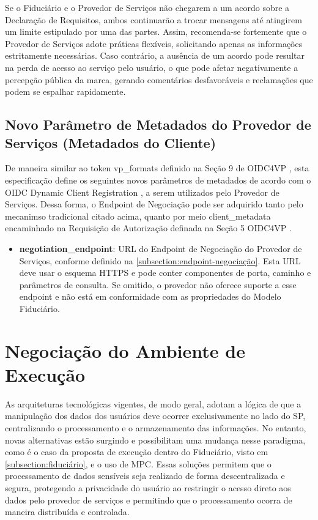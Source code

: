 Se o Fiduciário e o Provedor de Serviços não chegarem a um acordo sobre a Declaração de Requisitos, ambos continuarão a trocar mensagens até atingirem um limite estipulado por uma das partes. Assim, recomenda-se fortemente que o Provedor de Serviços adote práticas flexíveis, solicitando apenas as informações estritamente necessárias. Caso contrário, a ausência de um acordo pode resultar na perda de acesso ao serviço pelo usuário, o que pode afetar negativamente a percepção pública da marca, gerando comentários desfavoráveis e reclamações que podem se espalhar rapidamente.

\subsection{Novo Parâmetro de Metadados do Provedor de Serviços (Metadados do Cliente)}

De maneira similar ao token vp\_formats definido na Seção 9 de \acs{OIDC4VP} \cite{OIDC4VP2023}, esta especificação define os seguintes novos parâmetros de metadados de acordo com o \acs{OIDC Dynamic Client Registration} \cite{sakimura2023openidDiscovery}, a serem utilizados pelo Provedor de Serviços. Dessa forma, o Endpoint de Negociação pode ser adquirido tanto pelo mecanimso tradicional citado acima, quanto por meio client\_metadata encaminhado na Requisição de Autorização definada na Seção 5 \acs{OIDC4VP} \cite{OIDC4VP2023}.

\begin{itemize}
    \item \textbf{negotiation\_endpoint}: URL do Endpoint de Negociação do Provedor de Serviços, conforme definido na \autoref{subsection:endpoint-negociação}. Esta URL deve usar o esquema HTTPS e pode conter componentes de porta, caminho e parâmetros de consulta. Se omitido, o provedor não oferece suporte a esse endpoint e não está em conformidade com as propriedades do Modelo Fiduciário.
\end{itemize}


% 



\clearpage
\section{Negociação do Ambiente de Execução}\label{section:env-negotiation}

As arquiteturas tecnológicas vigentes, de modo geral, adotam a lógica de que a manipulação dos dados dos usuários deve ocorrer exclusivamente no lado do \acs{SP}, centralizando o processamento e o armazenamento das informações. No entanto, novas alternativas estão surgindo e possibilitam uma mudança nesse paradigma, como é o caso da proposta de execução dentro do Fiduciário, visto em \autoref{subsection:fiduciário}, e o uso de \acs{MPC}. Essas soluções permitem que o processamento de dados sensíveis seja realizado de forma descentralizada e segura, protegendo a privacidade do usuário ao restringir o acesso direto aos dados pelo provedor de serviços e permitindo que o processamento ocorra de maneira distribuída e controlada. 

